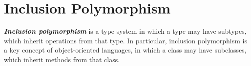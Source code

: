 \section{Inclusion Polymorphism}
\label{sec:inc-polymorp}

\textit{\textbf{Inclusion polymorphism}} is a type system in which a type may have subtypes, which inherit operations from that type. In particular, inclusion polymorphism is a key concept of object-oriented languages, in which a class may have subclasses, which inherit methods from that class.




